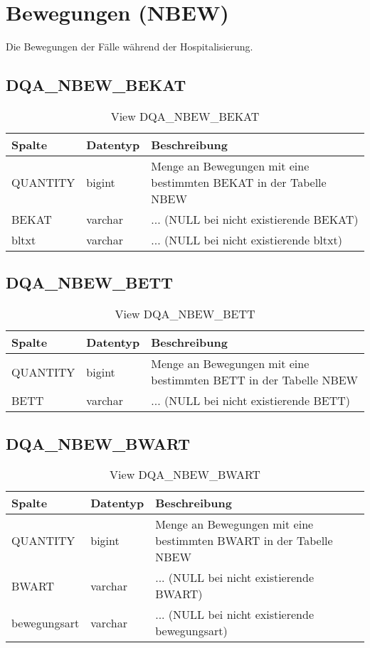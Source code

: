 \chapter{Bewegungen (NBEW)}
  Die Bewegungen der Fälle während der Hospitalisierung.

  \section{DQA\_NBEW\_BEKAT}

  \begin{table}[ht]
    \centering
    \caption{View DQA\_NBEW\_BEKAT}
    \label{tab:dqanbewbekat}
    \begin{tabular}{||l|l|p{10cm}||}
      \hline
      Spalte & Datentyp & Beschreibung \\ [0.5ex] \hline \hline
QUANTITY & bigint & Menge an Bewegungen mit eine bestimmten BEKAT in der Tabelle NBEW \\ \hline
BEKAT & varchar & ... (NULL bei nicht existierende BEKAT)\\ \hline
bltxt & varchar & ... (NULL bei nicht existierende bltxt)\\ \hline
    \end{tabular}
  \end{table}
 \clearpage
  \section{DQA\_NBEW\_BETT}

  \begin{table}[ht]
    \centering
    \caption{View DQA\_NBEW\_BETT}
    \label{tab:dqanbewbett}
    \begin{tabular}{||l|l|p{10cm}||}
      \hline
      Spalte & Datentyp & Beschreibung \\ [0.5ex] \hline \hline
QUANTITY & bigint & Menge an Bewegungen mit eine bestimmten BETT in der Tabelle NBEW \\ \hline
BETT & varchar & ... (NULL bei nicht existierende BETT)\\ \hline
    \end{tabular}
  \end{table}
 \clearpage
  \section{DQA\_NBEW\_BWART}

  \begin{table}[ht]
    \centering
    \caption{View DQA\_NBEW\_BWART}
    \label{tab:dqanbewbwart}
    \begin{tabular}{||l|l|p{10cm}||}
      \hline
      Spalte & Datentyp & Beschreibung \\ [0.5ex] \hline \hline
QUANTITY & bigint & Menge an Bewegungen mit eine bestimmten BWART in der Tabelle NBEW \\ \hline
BWART & varchar & ... (NULL bei nicht existierende BWART)\\ \hline
bewegungsart & varchar & ... (NULL bei nicht existierende bewegungsart)\\ \hline
    \end{tabular}
  \end{table}
 \clearpage
